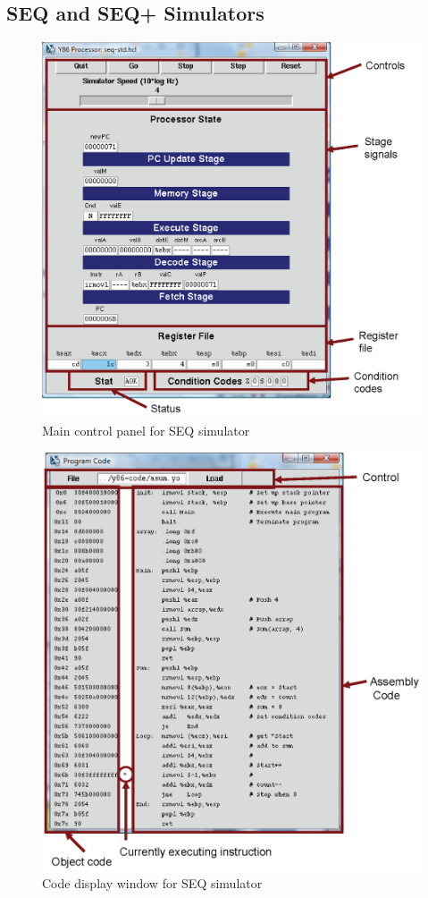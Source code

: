 \documentclass[11pt]{article}
\begin{document}
\subsection{SEQ and SEQ+ Simulators}

\begin{figure}
\centerline{\includegraphics*[scale=0.8]{seq-cntl.eps}}
\caption{Main control panel for SEQ simulator}
\label{fig:sim:seq-cntl}
\end{figure}

\begin{figure}
\centerline{\includegraphics*[scale=0.8]{seq-code.eps}}
\caption{Code display window for SEQ simulator}
\label{fig:sim:seq-code}
\end{figure}
\end{document}
